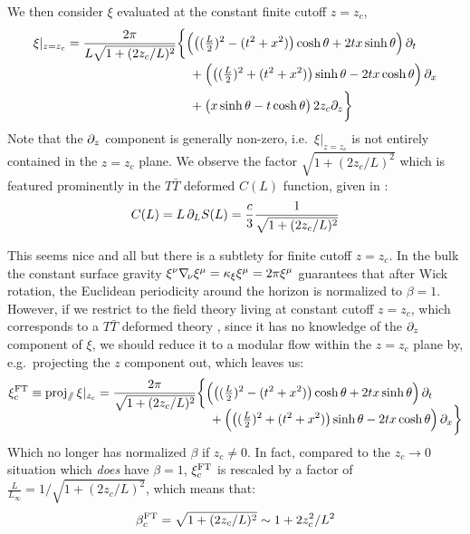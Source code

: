\documentclass[11pt,a4paper]{article}
\begin{document}
	We then consider $\xi$ evaluated at the {constant finite cutoff} $z = z_c$,
	\begin{equation}
	\begin{aligned}
		\xi|_{z=z_c}
		= \frac{2\pi}{
				L\sqrt{1 + (2z_c/L)^2}
			}
		& \bigg\{
			\pqty\Big{
				\pqty{
					(\tfrac{L}{2})^2
					- (t^2 + x^2)
				} \cosh\theta
				+ 2tx \sinh\theta
			} \,\pdd{t}
		\\[-.5ex] &\quad 
			+ \pqty\Big{
				\pqty{
					(\tfrac{L}{2})^2
					+ (t^2 + x^2)
				} \sinh\theta
				- 2tx \cosh\theta
			} \,\pdd{x}
		\\ &\quad 
			+ \pqty\big{
				x\sinh\theta
				- t\cosh\theta
			} \,2z_c\pdd{z}
		\bigg\}
	\end{aligned}
	\end{equation}
	Note that the $\partial_{z}$ component is generally non-zero, i.e.~$\xi|_{z=z_c}$ is not entirely contained in the $z = z_c$ plane. 
	We observe the factor $
		\sqrt{1 + (2z_c/L)^2}
	$ which is featured prominently in the $T\bar{T}$ deformed $C(L)$ function, given in \cite{Lewkowycz:2019xse}:
	\begin{equation}
		C(L) = L\,\partial_{L} S(L)
		= \frac{c}{3} 
			\frac{1}{
				\sqrt{1 + (2z_c/L)^2}
			}
	\end{equation}
	
	This seems nice and all but there is a subtlety for finite cutoff $z = z_c$. 
	In the bulk the constant surface gravity $
		\xi^\nu \nabla_{\!\mathnormal{\nu}} \xi^\mu
		= \kappa_\xi \xi^\mu
		= 2\pi \xi^\mu
	$ guarantees that after Wick rotation, the Euclidean periodicity around the horizon is normalized to $\beta = 1$. However, if we restrict to the field theory living at constant cutoff $z = z_c$, which corresponds to a $T\bar{T}$ deformed theory \cite{McGough:2016lol,Lewkowycz:2019xse} , since it has no knowledge of the $\partial_{z}$ component of $\xi$, we should reduce it to a modular flow within the $z = z_c$ plane by, e.g.~projecting the $z$ component out, which leaves us:
	\begin{equation}
	\begin{aligned}
		\xi^{\mrm{FT}}_c
		\equiv \proj{\sslash} \xi|_{z_c}
		= \frac{2\pi}{
				\sqrt{1 + (2z_c/L)^2}
			}
		& \bigg\{
			\pqty\Big{
				\pqty{
					(\tfrac{L}{2})^2
					- (t^2 + x^2)
				} \cosh\theta
				+ 2tx \sinh\theta
			} \,\pdd{t}
		\\[-2ex] &\quad 
			+ \pqty\Big{
				\pqty{
					(\tfrac{L}{2})^2
					+ (t^2 + x^2)
				} \sinh\theta
				- 2tx \cosh\theta
			} \,\pdd{x}
		\bigg\}
	\end{aligned}
	\end{equation}
	Which no longer has normalized $\beta$ if $z_c \ne 0$. In fact, compared to the $z_c \to 0$ situation which \textit{does} have $\beta = 1$, $\xi^{\mathrm{FT}}_c$ is rescaled by a factor of $
		\frac{L}{L_\infty}
		= 1/\sqrt{1 + (2z_c/L)^2}
	$, which means that:
	\begin{equation}
		\beta^{\mathrm{FT}}_c
		= \sqrt{1 + (2z_c/L)^2}
		\sim 1 + 2z_c^2 / L^2
	\end{equation}
	
\end{document}
